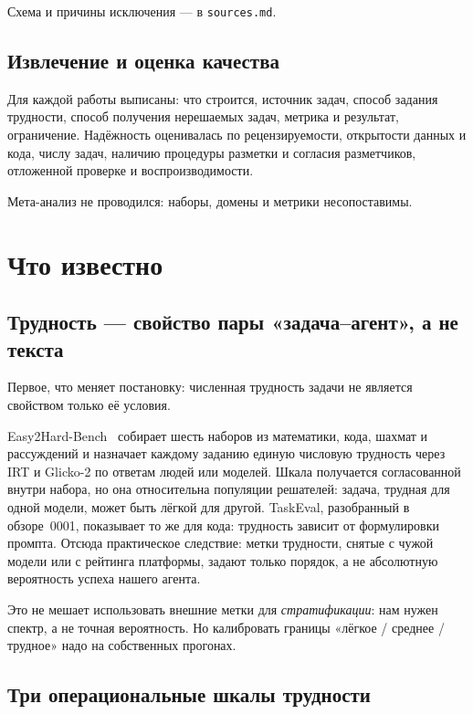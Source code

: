 \documentclass[11pt,a4paper]{article}
\begin{document}
Схема и причины исключения — в \texttt{sources.md}.

\subsection{Извлечение и оценка качества}

Для каждой работы выписаны: что строится, источник задач, способ задания
трудности, способ получения нерешаемых задач, метрика и результат,
ограничение. Надёжность оценивалась по рецензируемости, открытости данных и
кода, числу задач, наличию процедуры разметки и согласия разметчиков,
отложенной проверке и воспроизводимости.

Мета-анализ не проводился: наборы, домены и метрики несопоставимы.

\section{Что известно}

\subsection{Трудность — свойство пары «задача--агент», а не текста}

Первое, что меняет постановку: численная трудность задачи не является
свойством только её условия.

Easy2Hard-Bench~\cite{easy2hard2024} собирает шесть наборов из математики,
кода, шахмат и рассуждений и назначает каждому заданию единую числовую
трудность через IRT и Glicko-2 по ответам людей или моделей. Шкала
получается согласованной внутри набора, но она относительна популяции
решателей: задача, трудная для одной модели, может быть лёгкой для другой.
TaskEval, разобранный в обзоре~0001, показывает то же для кода: трудность
зависит от формулировки промпта. Отсюда практическое следствие: метки
трудности, снятые с чужой модели или с рейтинга платформы, задают только
порядок, а не абсолютную вероятность успеха нашего агента.

Это не мешает использовать внешние метки для \emph{стратификации}: нам
нужен спектр, а не точная вероятность. Но калибровать границы «лёгкое /
среднее / трудное» надо на собственных прогонах.

\subsection{Три операциональные шкалы трудности}
\end{document}
